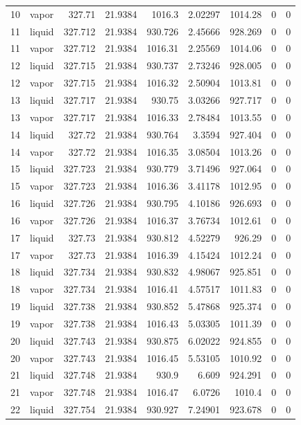 \begin{longtable}{r l r r r r r r r}
10 & vapor & 327.71 & 21.9384 & 1016.3 & 2.02297 & 1014.28 & 0 & 0 \\
11 & liquid & 327.712 & 21.9384 & 930.726 & 2.45666 & 928.269 & 0 & 0 \\
11 & vapor & 327.712 & 21.9384 & 1016.31 & 2.25569 & 1014.06 & 0 & 0 \\
12 & liquid & 327.715 & 21.9384 & 930.737 & 2.73246 & 928.005 & 0 & 0 \\
12 & vapor & 327.715 & 21.9384 & 1016.32 & 2.50904 & 1013.81 & 0 & 0 \\
13 & liquid & 327.717 & 21.9384 & 930.75 & 3.03266 & 927.717 & 0 & 0 \\
13 & vapor & 327.717 & 21.9384 & 1016.33 & 2.78484 & 1013.55 & 0 & 0 \\
14 & liquid & 327.72 & 21.9384 & 930.764 & 3.3594 & 927.404 & 0 & 0 \\
14 & vapor & 327.72 & 21.9384 & 1016.35 & 3.08504 & 1013.26 & 0 & 0 \\
15 & liquid & 327.723 & 21.9384 & 930.779 & 3.71496 & 927.064 & 0 & 0 \\
15 & vapor & 327.723 & 21.9384 & 1016.36 & 3.41178 & 1012.95 & 0 & 0 \\
16 & liquid & 327.726 & 21.9384 & 930.795 & 4.10186 & 926.693 & 0 & 0 \\
16 & vapor & 327.726 & 21.9384 & 1016.37 & 3.76734 & 1012.61 & 0 & 0 \\
17 & liquid & 327.73 & 21.9384 & 930.812 & 4.52279 & 926.29 & 0 & 0 \\
17 & vapor & 327.73 & 21.9384 & 1016.39 & 4.15424 & 1012.24 & 0 & 0 \\
18 & liquid & 327.734 & 21.9384 & 930.832 & 4.98067 & 925.851 & 0 & 0 \\
18 & vapor & 327.734 & 21.9384 & 1016.41 & 4.57517 & 1011.83 & 0 & 0 \\
19 & liquid & 327.738 & 21.9384 & 930.852 & 5.47868 & 925.374 & 0 & 0 \\
19 & vapor & 327.738 & 21.9384 & 1016.43 & 5.03305 & 1011.39 & 0 & 0 \\
20 & liquid & 327.743 & 21.9384 & 930.875 & 6.02022 & 924.855 & 0 & 0 \\
20 & vapor & 327.743 & 21.9384 & 1016.45 & 5.53105 & 1010.92 & 0 & 0 \\
21 & liquid & 327.748 & 21.9384 & 930.9 & 6.609 & 924.291 & 0 & 0 \\
21 & vapor & 327.748 & 21.9384 & 1016.47 & 6.0726 & 1010.4 & 0 & 0 \\
22 & liquid & 327.754 & 21.9384 & 930.927 & 7.24901 & 923.678 & 0 & 0 \\

\end{longtable}
